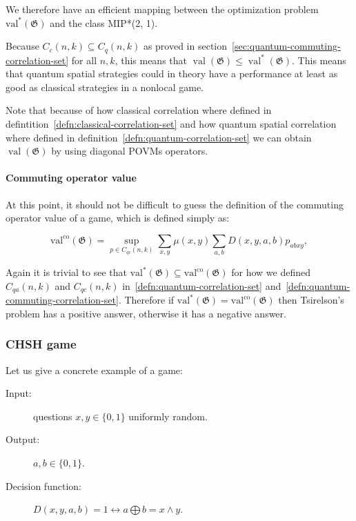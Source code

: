 We therefore have an efficient mapping between the optimization problem $\operatorname{val^{*}}(\mathfrak{G})$ and the class MIP*(2, 1).


Because $C_{c}(n, k) \subseteq C_{q}(n, k)$ as proved in section~\ref{sec:quantum-commuting-correlation-set} for all $n, k$, this means that $\operatorname{val}(\mathfrak{G}) \leq \operatorname{val}^{*}(\mathfrak{G})$. This means that quantum spatial strategies could in theory have a performance at least as good as classical strategies in a nonlocal game.

Note that because of how classical correlation where defined in defintition~\ref{defn:classical-correlation-set} and how quantum spatial correlation where defined in definition~\ref{defn:quantum-correlation-set} we can obtain $\operatorname{val}(\mathfrak{G})$ by using diagonal POVMs operators.  

\paragraph{Commuting operator value}

At this point, it should not be difficult to guess the definition of the commuting operator value of a game, which is defined simply as:

\begin{defn}
    \begin{equation}
    \operatorname{val^\text{co}}(\mathfrak{G})=\sup _{p \in C_{q c}(n, k)} \sum_{x, y} \mu(x, y) \sum_{a, b} D(x, y, a, b) p_{a b x y},
    \end{equation}
\end{defn}

Again it is trivial to see that $\operatorname{val^{*}}(\mathfrak{G}) \subseteq \operatorname{val^\text{co}}(\mathfrak{G})$ for how we defined $C_{q a}(n, k)$ and $C_{q c}(n, k)$ in~\ref{defn:quantum-correlation-set} and~\ref{defn:quantum-commuting-correlation-set}.
Therefore if $\operatorname{val^{*}}(\mathfrak{G}) = \operatorname{val^\text{co}}(\mathfrak{G})$ then Tsirelson's problem has a positive answer, otherwise it has a negative answer.


\subsubsection{CHSH game}

Let us give a concrete example of a game:
\begin{description}
\item[Input:]questions $x,y \in \{0,1\}$ uniformly random.
\item[Output:]$a,b \in \{0,1\}$.
\item[Decision function: ]$D(x, y, a, b) = 1 \leftrightarrow a \bigoplus b = x \land y $. 
\end{description}


